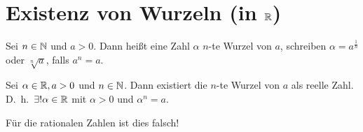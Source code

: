 \documentclass[../ana1.tex]{subfiles}
\begin{document}
\setcounter{section}{5}

\section{Existenz von Wurzeln (in \(\mathbb{R} \))}
Sei \( n\in\mathbb{N} \) und \(a>0\). Dann heißt eine Zahl \(\alpha \) \(n\)-te Wurzel von \(a\), schreiben \(\alpha = a^{\frac{1}{n}}\) oder \(\sqrt[n]{a}\), falls \(a^n = a\).
\begin{satz}
	Sei \(\alpha \in\mathbb{R}, a>0\) und \(n\in\mathbb{N} \). Dann existiert die \(n\)-te Wurzel von \(a\) als reelle Zahl. D.\ h.\  \(\exists ! \alpha\in\mathbb{R} \) mit \(\alpha>0\) und \(\alpha^n = a\).
\end{satz}
\begin{bem}
	Für die rationalen Zahlen ist dies falsch!
\end{bem}
\end{document}
